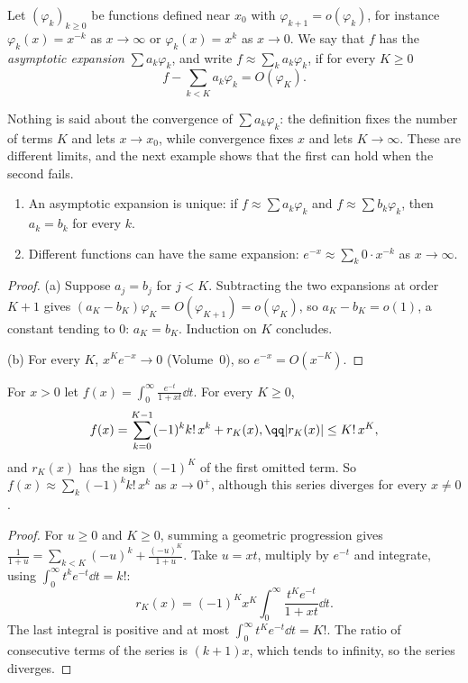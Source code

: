 \begin{definition}
Let $(\varphi_k)_{k\ge0}$ be functions defined near $x_0$ with $\varphi_{k+1}=o(\varphi_k)$, for instance $\varphi_k(x)=x^{-k}$ as $x\to\infty$ or $\varphi_k(x)=x^k$ as
$x\to0$. We say that $f$ has the \emph{asymptotic expansion} $\sum a_k\varphi_k$, and write $f\approx\sum_ka_k\varphi_k$, if for every $K\ge0$
\[
f-\sum_{k<K}a_k\varphi_k=O(\varphi_K).
\]
\end{definition}

Nothing is said about the convergence of $\sum a_k\varphi_k$: the definition fixes the number of terms $K$ and lets $x\to x_0$, while convergence
fixes $x$ and lets $K\to\infty$. These are different limits, and the next example shows that the first can hold when the second fails.

\begin{proposition}\label{prop:asymunique}
\begin{enumerate}[label=(\alph*)]
\item An asymptotic expansion is unique: if $f\approx\sum a_k\varphi_k$ and $f\approx\sum b_k\varphi_k$, then $a_k=b_k$ for every $k$.
\item Different functions can have the same expansion: $e^{-x}\approx\sum_k0\cdot x^{-k}$ as $x\to\infty$.
\end{enumerate}
\end{proposition}
\begin{proof}
(a) Suppose $a_j=b_j$ for $j<K$. Subtracting the two expansions at order $K+1$ gives $(a_K-b_K)\varphi_K=O(\varphi_{K+1})=o(\varphi_K)$, so
$a_K-b_K=o(1)$, a constant tending to $0$: $a_K=b_K$. Induction on $K$ concludes.

(b) For every $K$, $x^Ke^{-x}\to0$ (Volume~0), so $e^{-x}=O(x^{-K})$.
\end{proof}

\begin{proposition}\label{prop:eulerseries}
For $x>0$ let $f(x)=\displaystyle\int_0^\infty\frac{e^{-t}}{1+xt}\dd t$. For every $K\ge0$,
\[
\begin{gathered}f(x)=\sum_{k=0}^{K-1}(-1)^kk!\,x^k+r_K(x),\qq |r_K(x)|\le K!\,x^K,\end{gathered}
\]
and $r_K(x)$ has the sign $(-1)^K$ of the first omitted term. So $f(x)\approx\sum_k(-1)^kk!\,x^k$ as $x\to0^+$, although this series
diverges for every $x\ne0$.
\end{proposition}
\begin{proof}
For $u\ge0$ and $K\ge0$, summing a geometric progression gives $\frac1{1+u}=\sum_{k<K}(-u)^k+\frac{(-u)^K}{1+u}$. Take $u=xt$, multiply by $e^{-t}$
and integrate, using $\int_0^\infty t^ke^{-t}\dd t=k!$:
\[
r_K(x)=(-1)^Kx^K\int_0^\infty\frac{t^Ke^{-t}}{1+xt}\dd t.
\]
The last integral is positive and at most $\int_0^\infty t^Ke^{-t}\dd t=K!$. The ratio of consecutive terms of the series is $(k+1)x$, which tends
to infinity, so the series diverges.
\end{proof}

